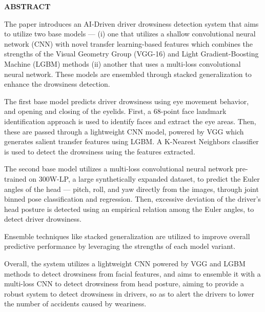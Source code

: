 \documentclass[a4paper,12pt]{report}
\begin{document}
\begin{center}
    {\Large \bfseries ABSTRACT}
\end{center}

The paper introduces an AI-Driven driver drowsiness detection system that aims to utilize two base models --- (i) one that utilizes a shallow convolutional neural network (CNN) with novel transfer learning-based features which combines the strengths of the Visual Geometry Group (VGG-16) and Light Gradient-Boosting Machine (LGBM) methods (ii) another that uses a multi-loss convolutional neural network. These models are ensembled through stacked generalization to enhance the drowsiness detection.

The first base model predicts driver drowsiness using eye movement behavior, and opening and closing of the eyelids. First, a 68-point face landmark identification approach is used to identify faces and extract the eye areas. Then, these are passed through a lightweight CNN model, powered by VGG which generates salient transfer features using LGBM. A K-Nearest Neighbors classifier is used to detect the drowsiness using the features extracted.

The second base model utilizes a multi-loss convolutional neural network pre-trained on 300W-LP, a large synthetically expanded dataset, to predict the Euler angles of the head --- pitch, roll, and yaw directly from the images, through joint binned pose classification and regression. Then, excessive deviation of the driver's head posture is detected using an empirical relation among the Euler angles, to detect driver drowsiness.

Ensemble techniques like stacked generalization are utilized to improve overall predictive performance by leveraging the strengths of each model variant.

Overall, the system utilizes a lightweight CNN powered by VGG and LGBM methods to detect drowsiness from facial features, and aims to ensemble it with a multi-loss CNN to detect drowsiness from head posture, aiming to provide a robust system to detect drowsiness in drivers, so as to alert the drivers to lower the number of accidents caused by weariness.

\clearpage

\setcounter{page}{1}
\end{document}
